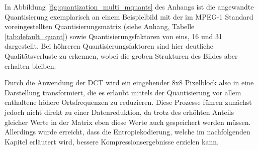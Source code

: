

In Abbildung \ref{fig:quantization_multi_mquants} des Anhangs ist die angewandte Quantisierung exemplarisch an einem Beispielbild mit der im MPEG-1 Standard voreingestellten Quantisierungsmatrix (siehe Anhang, Tabelle \ref{tab:default_quant}) sowie Quantisierungsfaktoren von eins, 16 und 31 dargestellt. %
Bei höhreren Quantisierungsfaktoren sind hier deutliche Qualitätsverluste zu erkennen, wobei die groben Strukturen des Bildes aber erhalten bleiben.

Durch die Anwendung der DCT wird ein eingehender 8x8 Pixelblock also in eine Darstellung transformiert, die es erlaubt mittels der Quantisierung vor allem enthaltene höhere Ortsfrequenzen zu reduzieren. Diese Prozesse führen zunächst jedoch nicht direkt zu einer Datenreduktion, da trotz des erhöhten Anteils gleicher Werte in der Matrix eben diese Werte auch gespeichert werden müssen. Allerdings wurde erreicht, dass die Entropiekodierung, welche im nachfolgenden Kapitel erläutert wird, bessere Kompressionsergebnisse erzielen kann.
